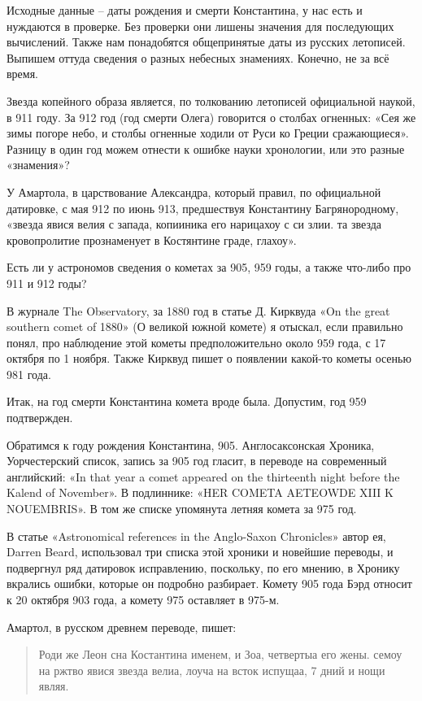 Исходные данные – даты рождения и смерти Константина, у нас есть и нуждаются в проверке. Без проверки они лишены значения для последующих вычислений. Также нам понадобятся общепринятые даты из русских летописей. Выпишем оттуда сведения о разных небесных знамениях. Конечно, не за всё время.

Звезда копейного образа является, по толкованию летописей официальной наукой, в 911 году. За 912 год (год смерти Олега) говорится о столбах огненных: «Сея же зимы погоре небо, и столбы огненные ходили от Руси ко Греции сражающиеся». Разницу в один год можем отнести к ошибке науки хронологии, или это разные «знамения»?

У Амартола, в царствование Александра, который правил, по официальной датировке, с мая 912 по июнь 913, предшествуя Константину Багрянородному, «звезда явися велия с запада, копииника его нарицахоу с си злии. та звезда кровопролитие прознаменует в Костянтине граде, глахоу».

Есть ли у астрономов сведения о кометах за 905, 959 годы, а также что-либо про 911 и 912 годы?

В журнале The Observatory, за 1880 год в статье Д. Кирквуда «On the great southern comet of 1880» (О великой южной комете)\cite{obs1880v3} я отыскал, если правильно понял, про наблюдение этой кометы предположительно около 959 года, с 17 октября по 1 ноября. Также Кирквуд пишет о появлении какой-то кометы осенью 981 года.

Итак, на год смерти Константина комета вроде была. Допустим, год 959 подтвержден.

Обратимся к году рождения Константина, 905. Англосаксонская Хроника, Уорчестерский список, запись за 905 год гласит, в переводе на современный английский: «In that year a comet appeared on the thirteenth night before the Kalend of November». В подлиннике: «HER COMETA AETEOWDE XIII K NOUEMBRIS». В том же списке упомянута летняя комета за 975 год.

В статье «Astronomical references in the Anglo-Saxon Chron\-icles»\cite{saxon01} автор ея, Darren Beard, использовал три списка этой хроники и новейшие переводы, и подвергнул ряд датировок исправлению, поскольку, по его мнению, в Хронику вкрались ошибки, которые он подробно разбирает. Комету 905 года Бэрд относит к 20 октября 903 года, а комету 975 оставляет в 975-м.

Амартол, в русском древнем переводе, пишет:

\begin{quotation}
Роди же Леон сна Костантина именем, и Зоа, четвертыа его жены. семоу на ржтво явися звезда велиа, лоуча на всток испущаа, 7 дний и нощи являя.
\end{quotation}

